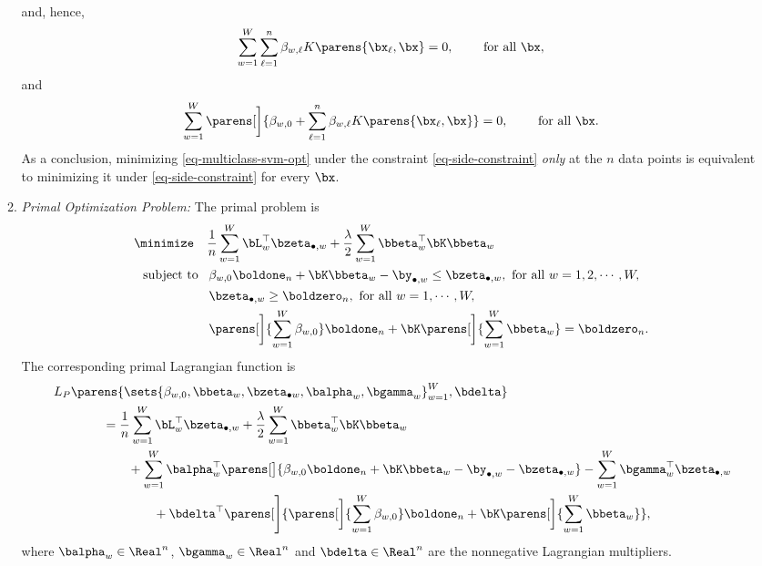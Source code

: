 \documentclass[12pt]{article}
\begin{document}
\begin{enumerate}[label=\textbf{\arabic*.}]
\begin{enumerate}
\begin{align*}
		\end{align*}
		and, hence, 
		\begin{align*}
			\sum_{w=1}^W \sum_{\ell=1}^n \beta_{w, \ell} K \parens{\bx_{\ell}, \bx} = 0, \qquad \text{ for all } \bx, 
		\end{align*}
		and 
		\begin{align*}
			\sum_{w=1}^W \parens[\bigg]{\beta_{w, 0} + \sum_{\ell=1}^n \beta_{w, \ell} K \parens{\bx_{\ell}, \bx}} = 0, \qquad \text{ for all } \bx. 
		\end{align*}
		As a conclusion, minimizing \eqref{eq-multiclass-svm-opt} under the constraint \eqref{eq-side-constraint} \emph{only} at the $n$ data points is equivalent to minimizing it under \eqref{eq-side-constraint} for every $\bx$. 
		
		\item \textit{Primal Optimization Problem:} The primal problem is 
		\begin{equation}
			\begin{aligned}
				\minimize \hspace{10pt} & \frac{1}{n} \sum_{w=1}^W \bL_w^\top \bzeta_{\bullet, w} + \frac{\lambda}{2} \sum_{w=1}^W \bbeta_{w}^\top \bK \bbeta_{w} \\ 
				\text{subject to } \  & \, \beta_{w,0} \boldone_{n} + \bK \bbeta_{w} - \by_{\bullet, w} \le \bzeta_{\bullet, w}, \text{ for all } w = 1, 2, \cdots, W, \\
				& \, \bzeta_{\bullet, w} \ge \boldzero_{n}, \text{ for all } w = 1, \cdots, W, \\ 
				& \, \parens[\bigg]{\sum_{w=1}^W \beta_{w,0} } \boldone_n + \bK \parens[\bigg]{\sum_{w=1}^W \bbeta_w} = \boldzero_n. 
			\end{aligned}
		\end{equation}
		The corresponding primal Lagrangian function is 
		\begin{align*}
			& \, L_P \parens{\sets{\beta_{w,0}, \bbeta_{w}, \bzeta_{\bullet w}, \balpha_w, \bgamma_w}_{w=1}^W, \bdelta} \\ 
			& \qquad \qquad = \frac{1}{n} \sum_{w=1}^W \bL_w^\top \bzeta_{\bullet, w} + \frac{\lambda}{2} \sum_{w=1}^W \bbeta_{w}^\top \bK \bbeta_{w} \\ 
			& \qquad \qquad \qquad + \sum_{w=1}^W \balpha_{w}^\top \parens[\big]{\beta_{w,0} \boldone_{n} + \bK \bbeta_{w} - \by_{\bullet, w} - \bzeta_{\bullet, w}} - \sum_{w=1}^W \bgamma_w^\top \bzeta_{\bullet,w} \\ 
			& \qquad \qquad \qquad \qquad + \bdelta^\top \parens[\Bigg]{\parens[\bigg]{\sum_{w=1}^W \beta_{w,0} } \boldone_n + \bK \parens[\bigg]{\sum_{w=1}^W \bbeta_w} }, 
		\end{align*}
		where $\balpha_w \in \Real^n$, $\bgamma_w \in \Real^n$ and $\bdelta \in \Real^{n}$ are the nonnegative Lagrangian multipliers. 
		

\end{enumerate}
\end{enumerate}
\end{document}
